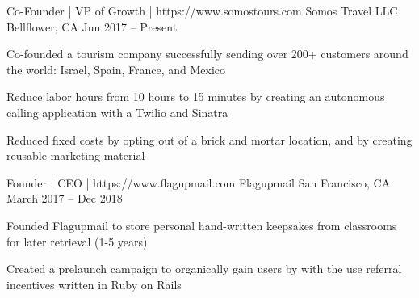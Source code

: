 \documentclass[]{awesome-cv}
\begin{document}
\begin{cventries}
	\cventry
	{Co-Founder | VP of Growth | https://www.somostours.com}
	{Somos Travel LLC}
	{Bellflower, CA}
	{Jun 2017 – Present}
	{\begin{cvitems}
		\item {Co-founded a tourism company successfully sending over 200+ customers around the world: Israel, Spain, France, and Mexico}
		\item {Reduce labor hours from 10 hours to 15 minutes by creating an autonomous calling application with a Twilio and Sinatra}
		\item {Reduced fixed costs by opting out of a brick and mortar location, and by creating reusable marketing material}
		\end{cvitems}}
	\cventry
	{Founder | CEO | https://www.flagupmail.com}
	{Flagupmail}
	{San Francisco, CA}
	{March 2017 – Dec 2018}
	{\begin{cvitems}
		\item {Founded Flagupmail to store personal hand-written keepsakes from classrooms for later retrieval (1-5 years)}
		\item {Created a prelaunch campaign to organically gain users by with the use referral incentives written in Ruby on Rails}
	\end{cvitems}}
\end{cventries}
\vspace{-5mm}
\end{document}
